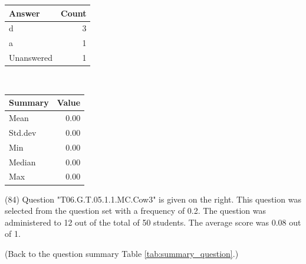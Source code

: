 \documentclass[12pt,english,nohyper]{tufte-handout}\usepackage[]{graphicx}\usepackage[]{color}
\begin{document}
\begin{center}%
\begin{tabular}{lr}
  \hline
Answer & Count \\ 
  \hline
d &   3 \\ 
  a &   1 \\ 
  Unanswered &   1 \\ 
   \hline
\end{tabular}
~~~~~~~~%
\begin{tabular}{lr}
  \hline
Summary & Value \\ 
  \hline
Mean & 0.00 \\ 
  Std.dev & 0.00 \\ 
  Min & 0.00 \\ 
  Median & 0.00 \\ 
  Max & 0.00 \\ 
   \hline
\end{tabular}
\end{center}\newpage{} (84) Question "T06.G.T.05.1.1.MC.Cow3" is given on the right. This question was selected from the question set with a frequency of 0.2. The question was administered to 12 out of the total of 50 students. The average score was 0.08 out of 1.

 (Back to the question summary Table \ref{tab:summary_question}.)
\end{document}
